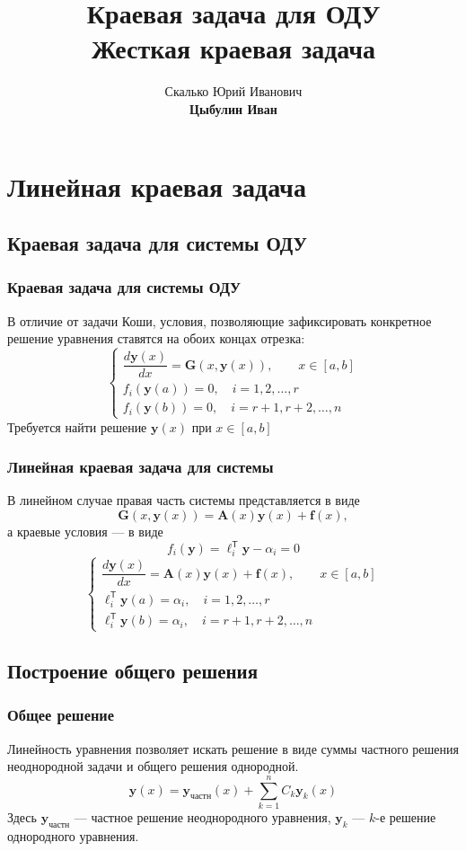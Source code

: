 \documentclass[professionalfonts,compress,unicode,aspectratio=169]{beamer}
\title[Краевая задача]{Краевая задача для ОДУ\\ Жесткая краевая задача}
\author[Цыбулин И.В.]{Скалько Юрий Иванович\\
\textbf{Цыбулин Иван}
}
\date{}
\begin{document}
\begin{frame}[plain]
\titlepage
\end{frame}

\def\L{\mathcal{L}}

\section{Линейная краевая задача}
\subsection{Краевая задача для системы ОДУ}
\begin{frame}\frametitle{Краевая задача для системы ОДУ}
	В отличие от задачи Коши, условия, позволяющие зафиксировать конкретное
	решение уравнения ставятся на обоих концах отрезка:
	\[
	\begin{cases}
	\dfrac{d\mathbf{y}(x)}{dx} = \mathbf{G}(x, \mathbf{y}(x)), \qquad x \in [a,b]\\
	f_i(\mathbf{y}(a)) = 0, \quad i = 1, 2, \dots, r\\
	f_i(\mathbf{y}(b)) = 0, \quad i = r+1, r+2, \dots, n
	\end{cases}
	\]
	Требуется найти решение $\mathbf{y}(x)$ при $x \in [a, b]$
\end{frame}

\begin{frame}\frametitle{Линейная краевая задача для системы}
	В линейном случае правая часть системы представляется в виде
	\[\mathbf{G}(x, \mathbf{y}(x)) = \mathbf{A}(x) \mathbf{y}(x) +
	\mathbf{f}(x),\]
	а краевые условия --- в виде
	\[
	f_i(\mathbf{y}) = \boldsymbol{\ell}_i^\mathsf{T} \mathbf{y} - \alpha_i = 0
	\]
	\[
	\begin{cases}
	\dfrac{d\mathbf{y}(x)}{dx} = \mathbf{A}(x) \mathbf{y}(x) + \mathbf{f}(x), \qquad x \in [a,b]\\
	\boldsymbol{\ell}_i^\mathsf{T} \mathbf{y}(a) = \alpha_i, \quad i = 1, 2, \dots, r\\
	\boldsymbol{\ell}_i^\mathsf{T} \mathbf{y}(b) = \alpha_i, \quad i = r+1, r+2, \dots, n
	\end{cases}
	\]
\end{frame}

\subsection{Построение общего решения}
\begin{frame}\frametitle{Общее решение}
	Линейность уравнения позволяет искать решение в виде суммы частного решения неоднородной
	задачи и общего решения однородной.
	\[
	\mathbf{y}(x) = \mathbf{y}_\text{частн}(x) + \sum_{k=1}^n C_k \mathbf{y}_k(x)
	\]
	Здесь $\mathbf{y}_\text{частн}$ --- частное решение неоднородного уравнения,
	$\mathbf{y}_k$ --- $k$-е решение однородного уравнения.
\end{frame}
\end{document}
